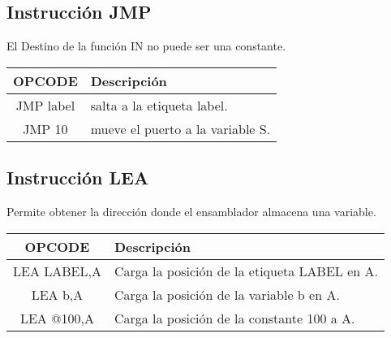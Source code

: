 \documentclass[12pt]{article}
\begin{document}
\subsection{Instrucci\'on JMP }
El Destino de la funci\'on IN no puede ser una constante.\\
\begin{tabular}{| c | p{11.5cm}|}
\hline 
OPCODE & Descripci\'on  \\ \hline
JMP label & salta a la etiqueta label.\\ \hline
JMP 10  & mueve el puerto a la variable S.\\ \hline
\end{tabular}

\subsection{Instrucci\'on LEA}
Permite obtener la direcci\'on donde el ensamblador almacena una variable.\\
\begin{tabular}{| c | p{11.5cm}|}
\hline 
OPCODE & Descripci\'on  \\ \hline
LEA LABEL,A & Carga la posici\'on de la etiqueta LABEL en A.\\ \hline
LEA b,A     & Carga la posici\'on de la variable b en A.\\ \hline
LEA @100,A  & Carga la posici\'on de la constante 100 a A.\\ \hline
\end{tabular}
\end{document}
